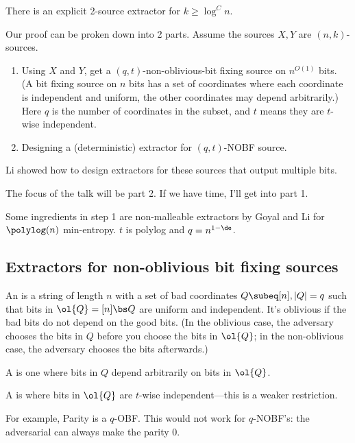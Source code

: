 \begin{thm}
There is an explicit 2-source extractor for $k\ge \log^Cn$.
\end{thm}
Our proof can be proken down into 2 parts. Assume the sources $X,Y$ are $(n,k)$-sources.
\begin{enumerate}
\item
Using $X$ and $Y$, get a $(q,t)$-non-oblivious-bit fixing source on $n^{O(1)}$ bits. (A bit fixing source on $n$ bits has a set of coordinates where each coordinate is independent and uniform, the other coordinates may depend arbitrarily.)
Here $q$ is the number of coordinates in the subset, and $t$ means they are $t$-wise independent.
\item
Designing a (deterministic) extractor for $(q,t)$-NOBF source.
\end{enumerate}
Li showed how to design extractors for these sources that output multiple bits.

The focus of the talk will be part 2. If we have time, I'll get into part 1.

Some ingredients in step 1 are non-malleable extractors by Goyal and Li for $\polylog(n)$ min-entropy.
$t$ is polylog and $q=n^{1-\de}$. %

\subsection{Extractors for non-oblivious bit fixing sources}

\begin{df}
An  is a string of length $n$ with a set of bad coordinates $Q\subeq [n],|Q|=q$ such that bits in $\ol{Q}=[n]\bs Q$ are uniform and independent. It's oblivious if the bad bits do not depend on the good bits.
(In the oblivious case, the adversary chooses the bits in $Q$ before you choose the bits in $\ol{Q}$; in the non-oblivious case, the adversary chooses the bits afterwards.)

A  is one where bits in $Q$ depend arbitrarily on bits in $\ol{Q}$.

A  is where bits in $\ol{Q}$ are $t$-wise independent---this is a weaker restriction.
\end{df}
For example, Parity is a $q$-OBF. This would not work for $q$-NOBF's: the adversarial can always make the parity 0.

